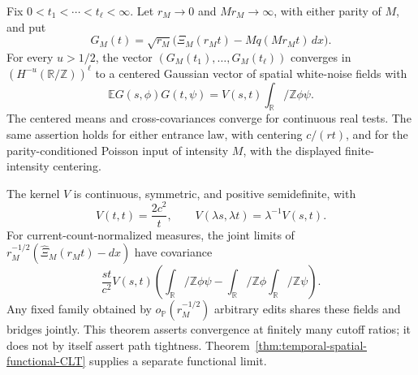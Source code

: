 \documentclass[11pt,letterpaper]{article}
\newcommand{\PP}{\mathbb P}\newcommand{\EE}{\mathbb E}
\newcommand{\T}{\mathbb R/\mathbb Z}\newcommand{\Leb}{\operatorname{Leb}}
\begin{document}
\begin{theorem}
\label{thm:temporal-spatial-CLT}
Fix $0<t_1<\cdots<t_\ell<\infty$. Let $r_M\to0$ and
$Mr_M\to\infty$, with either parity of $M$, and put
\[
 G_M(t)=\sqrt{r_M}\big(\Xi_M(r_Mt)-Mq(Mr_Mt)\,dx\big).
\]
For every $u>1/2$, the vector
$(G_M(t_1),\ldots,G_M(t_\ell))$ converges in
$(H^{-u}(\T))^\ell$ to a centered Gaussian vector of spatial
white-noise fields with
\begin{equation}\label{eq:temporal-spatial-covariance}
 \EE G(s,\phi)G(t,\psi)=V(s,t)\int_\T\phi\psi.
\end{equation}
The centered means and cross-covariances converge for continuous
real tests. The same assertion holds for either entrance law,
with centering $c/(r t)$, and for the parity-conditioned Poisson
input of intensity $M$, with the displayed finite-intensity
centering.

The kernel $V$ is continuous, symmetric, and positive
semidefinite, with
\begin{equation}\label{eq:temporal-covariance-scaling}
 V(t,t)=\frac{2c^2}{t},\qquad
 V(\lambda s,\lambda t)=\lambda^{-1}V(s,t).
\end{equation}
For current-count-normalized measures, the joint limits of
$r_M^{-1/2}(\widehat\Xi_M(r_Mt)-dx)$ have covariance
\begin{equation}\label{eq:temporal-bridge-covariance}
 \frac{st}{c^2}V(s,t)
       \left(\int_\T\phi\psi-\int_\T\phi\int_\T\psi\right).
\end{equation}
Any fixed family obtained by $o_{\PP}(r_M^{-1/2})$ arbitrary
edits shares these fields and bridges jointly. This theorem
asserts convergence at finitely many cutoff ratios; it does
not by itself assert path tightness. Theorem~\ref{thm:temporal-spatial-functional-CLT}
supplies a separate functional limit.
\end{theorem}
\end{document}
